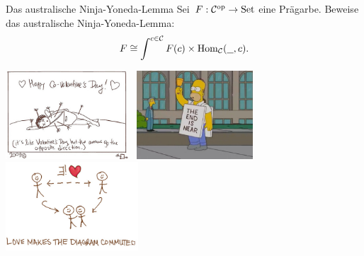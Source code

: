 \documentclass{uebblatt}
\begin{document}
\begin{aufgabe}{Das australische Ninja-Yoneda-Lemma}
Sei~$F : \mathcal{C}^{\mathrm{op}} \to \mathrm{Set}$ eine Prägarbe. Beweise das australische
Ninja-Yoneda-Lemma:
\[ F \cong \int^{c \in \mathcal{C}} F(c) \times \mathrm{Hom}_{\mathcal{C}}(\underline{\ \ }, c). \]
%
\end{aufgabe}

\vspace{-1em}
\centering
\href{https://topologicalmusings.wordpress.com/2009/02/14/happy-co-valentines-day/}{\includegraphics[height=3.3cm]{images/happy-co-valentine}}
\
\includegraphics[height=3.3cm]{images/homer-the-end}
\
\href{http://brownsharpie.courtneygibbons.org/?p=1253}{\includegraphics[height=3.3cm]{images/love-commute}}
\par
\end{document}
